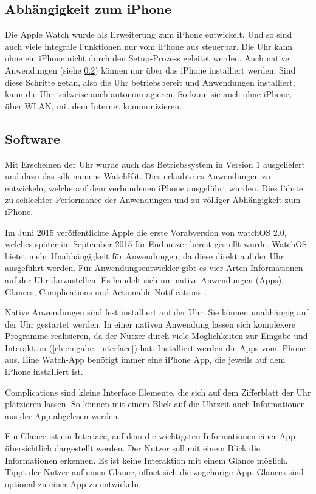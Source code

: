 \subsection{Abhängigkeit zum iPhone}
Die Apple Watch wurde als Erweiterung zum iPhone entwickelt. Und so sind auch viele integrale Funktionen nur vom iPhone aus steuerbar. Die Uhr kann ohne ein iPhone nicht durch den Setup-Prozess geleitet werden. Auch native Anwendungen (siehe \ref{ch:watch_software}) können nur über das iPhone installiert werden. Sind diese Schritte getan, also die Uhr betriebsbereit und Anwendungen installiert, kann die Uhr teilweise auch autonom agieren. So kann sie auch ohne iPhone, über WLAN, mit dem Internet kommunizieren.

\subsection{Software}
\label{ch:watch_software}
Mit Erscheinen der Uhr wurde auch das Betriebssystem in Version 1 ausgeliefert und dazu das \gls{sdk} namens WatchKit. Dies erlaubte es Anwendungen zu entwickeln, welche auf dem verbundenen iPhone ausgeführt wurden. Dies führte zu schlechter Performance der Anwendungen und zu völliger Abhängigkeit zum iPhone.

Im Juni 2015 veröffentlichte Apple die erste Vorabversion von watchOS 2.0, welches später im September 2015 für Endnutzer bereit gestellt wurde. WatchOS bietet mehr Unabhängigkeit für Anwendungen, da diese direkt auf der Uhr ausgeführt werden. Für Anwendungsentwickler gibt es vier Arten Informationen auf der Uhr darzustellen. Es handelt sich um native Anwendungen (Apps), Glances, Complications und Actionable Notifications \cite{Apple:2015devAw}.

Native Anwendungen sind fest installiert auf der Uhr. Sie können unabhängig auf der Uhr gestartet werden. In einer nativen Anwendung lassen sich komplexere Programme realisieren, da der Nutzer durch viele Möglichkeiten zur Eingabe und Interaktion (\ref{ch:eingabe_interface}) hat. Installiert werden die Apps vom iPhone aus. Eine Watch-App benötigt immer eine iPhone App, die jeweils auf dem iPhone installiert ist.

Complications sind kleine Interface Elemente, die sich auf dem Zifferblatt der Uhr platzieren lassen. So können mit einem Blick auf die Uhrzeit auch Informationen aus der App abgelesen werden.

Ein Glance ist ein Interface, auf dem die wichtigsten Informationen einer App übersichtlich dargestellt werden. Der Nutzer soll mit einem Blick die Informationen erkennen. Es ist keine Interaktion mit einem Glance möglich. Tippt der Nutzer auf einen Glance, öffnet sich die zugehörige App. Glances sind optional zu einer App zu entwickeln.

